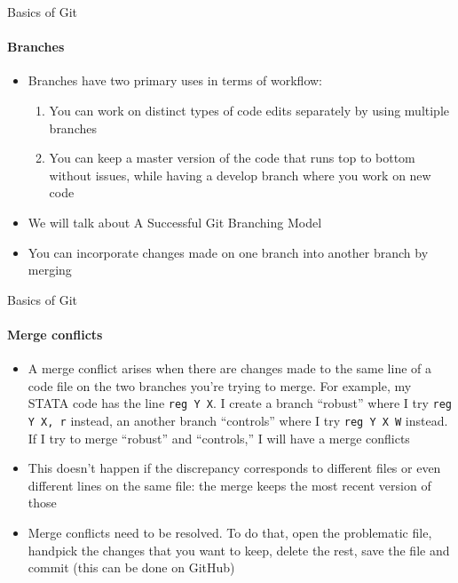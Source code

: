 \documentclass[10pt, aspectratio=169, xcolor=dvipsnames]{beamer}
\let\olditem\item
\renewcommand{\item}{%
\olditem\vspace{0.3em}}
\begin{document}
\begin{frame}[t]{Basics of Git}
    \framesubtitle{Branches}

    \normalsize\vspace{0.5em}
    \begin{itemize}
        \item \alert{Branches} have two primary uses in terms of workflow: 
        \begin{enumerate}
            \item You can work on distinct types of code edits separately by using multiple branches
            \item You can keep a \alert{master} version of the code that runs top to bottom without issues, while having a \alert{develop} branch where you work on new code
        \end{enumerate}
        \item We will talk about A Successful Git Branching Model
        \item You can incorporate changes made on one branch into another branch by \alert{merging}
    \end{itemize}
\end{frame}

\begin{frame}[t]{Basics of Git}
    \framesubtitle{Merge conflicts}

    \normalsize\vspace{0.5em}
    \begin{itemize}
        \item A merge conflict arises when there are changes made to the same line of a code file on the two branches you're trying to merge. For example, my STATA code has the line \texttt{reg Y X}. I create a branch ``robust'' where I try \texttt{reg Y X, r} instead, an another branch ``controls'' where I try \texttt{reg Y X W} instead. If I try to merge ``robust'' and ``controls,'' I will have a merge conflicts
        \item This doesn't happen if the discrepancy corresponds to different files or even different lines on the same file: the merge keeps the most recent version of those
        \item Merge conflicts need to be resolved. To do that, open the problematic file, handpick the changes that you want to keep, delete the rest, save the file and commit (this can be done on GitHub)
    \end{itemize}
\end{frame}
\end{document}
